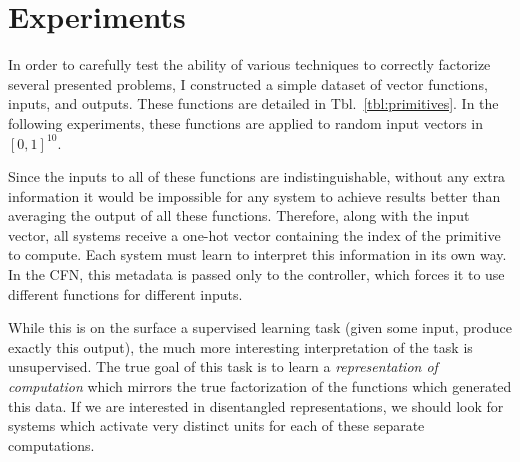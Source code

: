 \documentclass[12pt,twoside]{mitthesis}
\begin{document}
\section{Experiments}\label{experiments-1}

In order to carefully test the ability of various techniques to
correctly factorize several presented problems, I constructed a simple
dataset of vector functions, inputs, and outputs. These functions are
detailed in Tbl.~\ref{tbl:primitives}. In the following experiments,
these functions are applied to random input vectors in $[0,1]^{10}$.

Since the inputs to all of these functions are indistinguishable,
without any extra information it would be impossible for any system to
achieve results better than averaging the output of all these functions.
Therefore, along with the input vector, all systems receive a one-hot
vector containing the index of the primitive to compute. Each system
must learn to interpret this information in its own way. In the CFN,
this metadata is passed only to the controller, which forces it to use
different functions for different inputs.

While this is on the surface a supervised learning task (given some
input, produce exactly this output), the much more interesting
interpretation of the task is unsupervised. The true goal of this task
is to learn a \emph{representation of computation} which mirrors the
true factorization of the functions which generated this data. If we are
interested in disentangled representations, we should look for systems
which activate very distinct units for each of these separate
computations.
\end{document}
